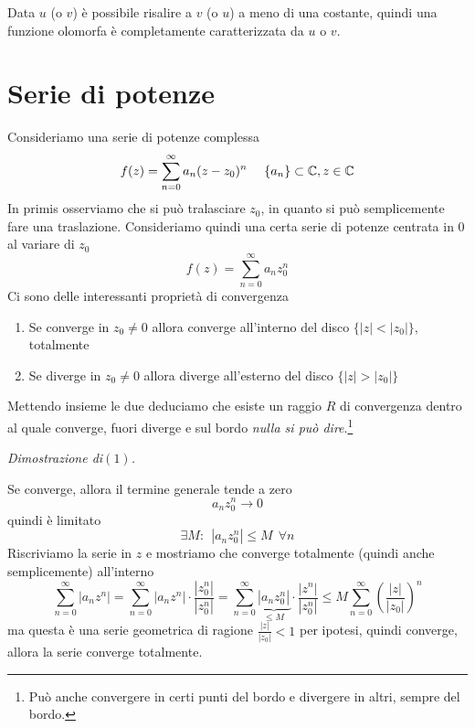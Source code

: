 Data $u$ (o $v$) è possibile risalire a $v$ (o $u$) a meno di una costante, quindi una funzione olomorfa è completamente caratterizzata da $u$ o $v$.

\section{Serie di potenze}

Consideriamo una serie di potenze complessa
\begin{equation*}
f(z) = \sum\limits^{\infty}_{n = 0} a_{n}(z - z_{0})^{n} \ \ \ \ \{a_{n}\} \subset \mathbb{C}, z\in \mathbb{C}
\end{equation*}
In primis osserviamo che si può tralasciare $z_{0}$, in quanto si può semplicemente fare una traslazione. Consideriamo quindi una certa serie di potenze centrata in $0$ al variare di $z_{0}$
\begin{equation*}
f(z) = \sum\limits^{\infty}_{n = 0} a_{n} z^{n}_{0}
\end{equation*}
Ci sono delle interessanti proprietà di convergenza
\begin{enumerate}
\item Se converge in $z_{0} \neq 0$ allora converge all'interno del disco $\{| z| < | z_{0}| \}$, totalmente
\item Se diverge in $z_{0} \neq 0$ allora diverge all'esterno del disco $\{| z| > | z_{0}| \}$
\end{enumerate}

Mettendo insieme le due deduciamo che esiste un raggio $R$ di convergenza dentro al quale converge, fuori diverge e sul bordo \textit{nulla si può dire}.\footnote{Può anche convergere in certi punti del bordo e divergere in altri, sempre del bordo.}

\textit{Dimostrazione di}$(1)$\textit{.}

Se converge, allora il termine generale tende a zero
\begin{equation*}
a_{n} z^{n}_{0}\rightarrow 0
\end{equation*}
quindi è limitato
\begin{equation*}
\exists M : \ \ \left| a_{n} z^{n}_{0}\right| \leq M\ \ \forall n
\end{equation*}
Riscriviamo la serie in $z$ e mostriamo che converge totalmente (quindi anche semplicemente) all'interno
\begin{equation*}
\sum\limits^{\infty}_{n = 0}\left| a_{n} z^{n}\right| = \sum\limits^{\infty}_{n = 0}\left| a_{n} z^{n}\right| \cdot \frac{\left| z^{n}_{0}\right|}{\left| z^{n}_{0}\right|} = \sum\limits^{\infty}_{n = 0}\underbrace{\left| a_{n} z^{n}_{0}\right|}_{\leq M} \cdot \frac{\left| z^{n}\right|}{\left| z^{n}_{0}\right|} \leq M\sum\limits^{\infty}_{n = 0}\left(\frac{| z|}{| z_{0}|}\right)^{n}
\end{equation*}
ma questa è una serie geometrica di ragione $\frac{| z|}{| z_{0}|} < 1$ per ipotesi, quindi converge, allora la serie converge totalmente.

